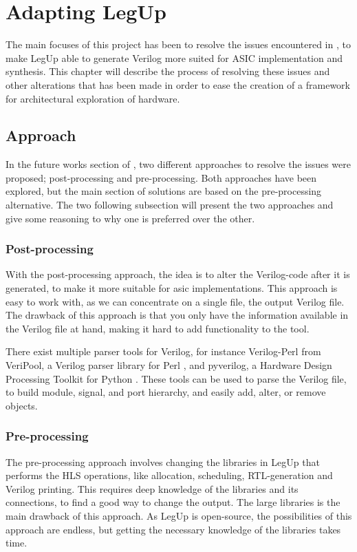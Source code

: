 \chapter{\label{chp:adaptinglegup}Adapting LegUp}
The main focuses of this project has been to resolve the issues encountered in \cite{holm2015pro}, to make LegUp able to generate Verilog more suited for ASIC implementation and synthesis. This chapter will describe the process of resolving these issues and other alterations that has been made in order to ease the creation of a framework for architectural exploration of hardware.
\section{Approach}
In the future works section of \cite{holm2015pro}, two different approaches to resolve the issues were proposed; post-processing and pre-processing. Both approaches have been explored, but the main section of solutions are based on the pre-processing alternative. The two following subsection will present the two approaches and give some reasoning to why one is preferred over the other.
\subsection{Post-processing}
With the post-processing approach, the idea is to alter the Verilog-code after it is generated, to make it more suitable for \gls{asic} implementations. This approach is easy to work with, as we can concentrate on a single file, the output Verilog file. The drawback of this approach is that you only have the information available in the Verilog file at hand, making it hard to add functionality to the tool.

There exist multiple parser tools for Verilog, for instance Verilog-Perl from VeriPool, a Verilog parser library for Perl \cite{verilogperl}, and pyverilog, a Hardware Design Processing Toolkit for Python \cite{Takamaeda2015Pyverilog}. These tools can be used to parse the Verilog file, to build module, signal, and port hierarchy, and easily add, alter, or remove objects.
\subsection{Pre-processing}
The pre-processing approach involves changing the libraries in LegUp that performs the HLS operations, like allocation, scheduling, RTL-generation and Verilog printing. This requires deep knowledge of the libraries and its connections, to find a good way to change the output. The large libraries is the main drawback of this approach. As LegUp is open-source, the possibilities of this approach are endless, but getting the necessary knowledge of the libraries takes time.
